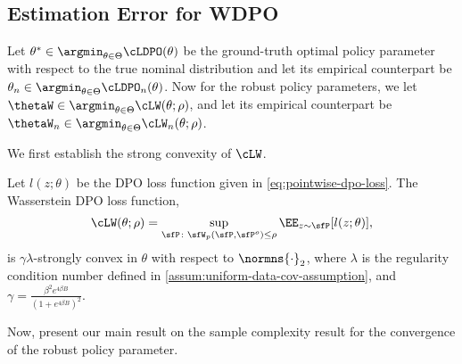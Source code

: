 \subsection{Estimation Error for WDPO}
Let $\theta^*\in\argmin_{\theta\in\Theta}\cLDPO(\theta)$ be the ground-truth optimal policy parameter with respect to the true nominal distribution and let its empirical counterpart be $\theta_n\in\argmin_{\theta\in\Theta}\cLDPO_n(\theta)$. Now for the robust policy parameters, we let $\thetaW\in\argmin_{\theta\in\Theta}\cLW(\theta;\rho)$, and let its empirical counterpart be $\thetaW_n\in\argmin_{\theta\in\Theta}\cLW_n(\theta;\rho)$. 

We first establish the strong convexity of $\cLW$. 
\begin{lemma}\label{lem:sup-dpo-strongly-convex}
    Let $l(z;\theta)$ be the DPO loss function given in  \cref{eq:pointwise-dpo-loss}. The Wasserstein DPO loss function,
    \begin{equation*}
     \cLW(\theta;\rho) = \sup_{\sfP\colon\sfW_p(\sfP,\sfP^o)\leq\rho} \EE_{z\sim\sfP}[l(z;\theta)],
    \end{equation*}
    is $\gamma\lambda$-strongly convex in $\theta$ with respect to $\normns{\cdot}_2$, where $\lambda$ is the regularity condition number defined in \cref{assum:uniform-data-cov-assumption}, and $\gamma=\frac{\beta^2e^{4\beta B}}{(1+e^{4\beta B})^2}$. 
\end{lemma}

Now, present our main result on the sample complexity result for the convergence of the robust policy parameter. 

